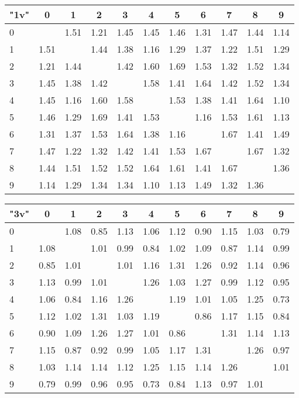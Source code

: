\begin{table*}
	\centering
	\begin{tabular}{|l||c|c|c|c|c|c|c|c|c|c|}\hline
		{\bf "1v"} & 0 & 1 & 2 & 3 & 4 & 5 & 6 & 7 & 8 & 9 \\\hline\hline
0 & &1.51 &1.21 &1.45 &1.45 &1.46 &1.31 &1.47 &1.44 &1.14  \\\hline
1 &1.51 & &1.44 &1.38 &1.16 &1.29 &1.37 &1.22 &1.51 &1.29  \\\hline
2 &1.21 &1.44 & &1.42 &1.60 &1.69 &1.53 &1.32 &1.52 &1.34  \\\hline
3 &1.45 &1.38 &1.42 & &1.58 &1.41 &1.64 &1.42 &1.52 &1.34  \\\hline
4 &1.45 &1.16 &1.60 &1.58 & &1.53 &1.38 &1.41 &1.64 &1.10  \\\hline
5 &1.46 &1.29 &1.69 &1.41 &1.53 & &1.16 &1.53 &1.61 &1.13  \\\hline
6 &1.31 &1.37 &1.53 &1.64 &1.38 &1.16 & &1.67 &1.41 &1.49  \\\hline
7 &1.47 &1.22 &1.32 &1.42 &1.41 &1.53 &1.67 & &1.67 &1.32  \\\hline
8 &1.44 &1.51 &1.52 &1.52 &1.64 &1.61 &1.41 &1.67 & &1.36  \\\hline
9 &1.14 &1.29 &1.34 &1.34 &1.10 &1.13 &1.49 &1.32 &1.36 &  \\\hline
	\end{tabular}

	\vspace{0.3cm}
	
	\begin{tabular}{|l||c|c|c|c|c|c|c|c|c|c|}\hline
		{\bf "3v"} & 0 & 1 & 2 & 3 & 4 & 5 & 6 & 7 & 8 & 9 \\\hline\hline
0 & &1.08 &0.85 &1.13 &1.06 &1.12 &0.90 &1.15 &1.03 &0.79  \\\hline
1 &1.08 & &1.01 &0.99 &0.84 &1.02 &1.09 &0.87 &1.14 &0.99  \\\hline
2 &0.85 &1.01 & &1.01 &1.16 &1.31 &1.26 &0.92 &1.14 &0.96  \\\hline
3 &1.13 &0.99 &1.01 & &1.26 &1.03 &1.27 &0.99 &1.12 &0.95  \\\hline
4 &1.06 &0.84 &1.16 &1.26 & &1.19 &1.01 &1.05 &1.25 &0.73  \\\hline
5 &1.12 &1.02 &1.31 &1.03 &1.19 & &0.86 &1.17 &1.15 &0.84  \\\hline
6 &0.90 &1.09 &1.26 &1.27 &1.01 &0.86 & &1.31 &1.14 &1.13  \\\hline
7 &1.15 &0.87 &0.92 &0.99 &1.05 &1.17 &1.31 & &1.26 &0.97  \\\hline
8 &1.03 &1.14 &1.14 &1.12 &1.25 &1.15 &1.14 &1.26 & &1.01  \\\hline
9 &0.79 &0.99 &0.96 &0.95 &0.73 &0.84 &1.13 &0.97 &1.01 &  \\\hline 
	\end{tabular}
	

\end{table*}
